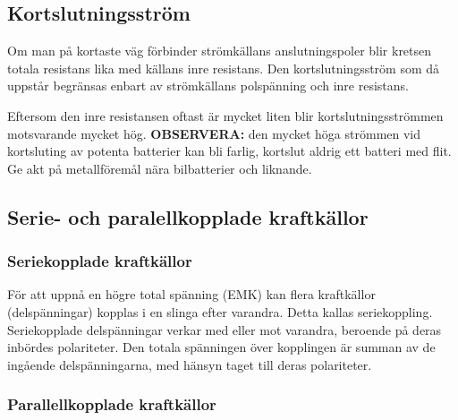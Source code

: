 \subsection{Kortslutningsström}


\label{kortslutningsström}

Om man på kortaste väg förbinder strömkällans anslutningspoler blir kretsen
totala resistans lika med källans inre resistans. Den kortslutningsström som då
uppstår begränsas enbart av strömkällans polspänning och inre resistans.

Eftersom den inre resistansen oftast är mycket liten blir kortslutningsströmmen
motsvarande mycket hög. \textbf{OBSERVERA:} den mycket höga strömmen
vid kortsluting av potenta batterier kan bli farlig, kortslut aldrig
ett batteri med flit. Ge akt på metallföremål nära bilbatterier och liknande.

\subsection{Serie- och paralellkopplade kraftkällor}
\label{kraftkällor_serie_paralell}

\subsubsection{Seriekopplade kraftkällor}

För att uppnå en högre total spänning (EMK) kan flera kraftkällor
(delspänningar) kopplas i en slinga efter varandra. Detta kallas seriekoppling.
Seriekopplade delspänningar verkar med eller mot varandra, beroende på deras
inbördes polariteter. Den totala spänningen över kopplingen är summan av de
ingående delspänningarna, med hänsyn taget till deras polariteter.

\subsubsection{Parallellkopplade kraftkällor}

